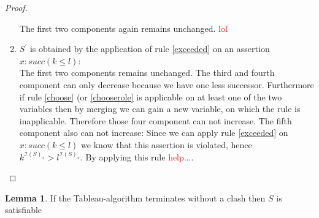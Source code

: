 \documentclass[a4paper,11pt]{scrartcl}
\theoremstyle{break}
\theoremstyle{definition}
\newtheorem{mylem}{Lemma}
\begin{document}
\begin{proof}
\begin{enumerate}
The first two components again remains unchanged. \textcolor{red}{lol}
\item $S^\prime$ is obtained by the application of rule \ref{exceeded} on an assertion $x:succ(k\leq l)$:\\
The first two components remains unchanged. The third and fourth component can only decrease because we have one less successor. Furthermore if rule \ref{choose} (or \ref{chooserole} is applicable on at least one of the two variables then by merging we can gain a new variable, on which the rule is inapplicable. Therefore those four component can not increase. The fifth component also can not increase: Since we can apply rule \ref{exceeded} on $x:succ(k\leq l)$ we know that this assertion is violated, hence $k^{\mathcal{I}(S)_x}>l^{\mathcal{I}(S)_x}$. By applying this rule \textcolor{red}{help}....
\end{enumerate}
\end{proof}
\iffalse
\begin{mylem}
If the Tableau-algorithm terminates without a clash then $S$ is satisfiable
\end{mylem}
\end{document}
